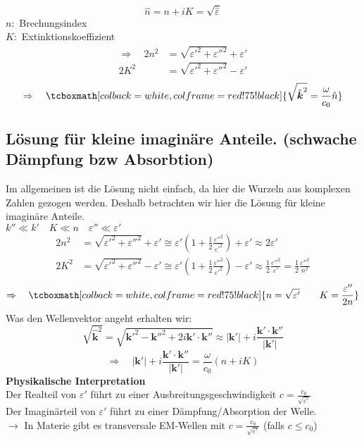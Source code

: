\documentclass[titlepage,11pt,a4paper,ngerman]{report}
\renewcommand{\vec}[1]{\boldsymbol{#1}}
\renewcommand{\epsilon}{\varepsilon}
\newcommand{\rmbox}[1]{\tcboxmath[colback=white,colframe=red!75!black]{#1}}
\begin{document}
\begin{equation*}
\hat{n} = n + i K = \sqrt{\hat{\epsilon}}
\end{equation*}
$ n : $ Brechungsindex\\
$ K : $ Extinktionskoeffizient
\begin{align*}
\Rightarrow \quad 2 n^2 &= \sqrt{\epsilon'^2 + \epsilon''^2} + \epsilon'\\
2 K^2 &= \sqrt{\epsilon'^2 + \epsilon''^2} - \epsilon'
\end{align*}
\begin{equation*}
\Rightarrow \quad \rmbox{\sqrt{\hat{\vec{k}}^2 } = \frac{\omega}{c_0} \hat{n}}
\end{equation*}

\subsection{Lösung für kleine imaginäre Anteile. (schwache Dämpfung bzw Absorbtion)}

Im allgemeinen ist die Lösung nicht einfach, da hier die Wurzeln aus komplexen Zahlen gezogen werden. Deshalb betrachten wir hier die Lösung für kleine imaginäre Anteile.\\
$ k'' \ll k' \quad K \ll n \quad \epsilon'' \ll \epsilon' $
\begin{align*}
2n^2 &= \sqrt{\epsilon'^2 + \epsilon''^2} + \epsilon' \cong \epsilon' \left(1 + \frac{1}{2} \frac{\epsilon''^2}{\epsilon'^2}\right) + \epsilon' \approx 2 \epsilon' \\
2K^2 &= \sqrt{\epsilon'^2 + \epsilon''^2} - \epsilon' \cong \epsilon' \left(1 + \frac{1}{2} \frac{\epsilon''^2}{\epsilon'^2}\right) - \epsilon' \approx \frac{1}{2} \frac{\epsilon''^2}{\epsilon'} = \frac{1}{2} \frac{\epsilon''^2}{n^2}
\end{align*}
\begin{equation*}
\Rightarrow \quad \rmbox{n = \sqrt{\epsilon'} \qquad K = \frac{\epsilon''}{2n}}
\end{equation*}
Was den Wellenvektor angeht erhalten wir:
\begin{equation*}
\sqrt{\hat{\vec{k}}^2} = \sqrt{\vec{k}'^2 - \vec{k}''^2 + 2 i \vec{k}' \cdot \vec{k}''} \approx | \vec{k}' | + i \frac{\vec{k}' \cdot \vec{k}''}{|\vec{k}'|}
\end{equation*}
\begin{equation*}
\Rightarrow \quad |\vec{k}'|  + i \frac{\vec{k}' \cdot \vec{k}''}{|\vec{k}'|} = \frac{\omega}{c_0} (n + i K)
\end{equation*}
\textbf{Physikalische Interpretation}\\[5pt]
Der Realteil von $\epsilon'$ führt zu einer Ausbreitungsgeschwindigkeit $ c = \frac{c_0}{\sqrt{\epsilon'}} $\\
Der Imaginärteil von $\epsilon'$ führt zu einer Dämpfung/Absorption der Welle.\\
$\rightarrow$ In Materie gibt es transversale EM-Wellen mit $ c = \frac{c_0}{\sqrt{\epsilon'}}$ (falls $c\leq c_0$)
\end{document}
